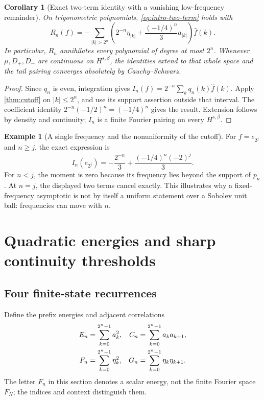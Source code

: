 \documentclass[11pt,a4paper]{article}
\newtheorem{corollary}[theorem]{Corollary}
\theoremstyle{definition}
\newtheorem{example}[theorem]{Example}
\theoremstyle{remark}
\numberwithin{equation}{section}
\begin{document}
\begin{corollary}[Exact two-term identity with a vanishing low-frequency remainder]
\label{cor:tail-formula}
On trigonometric polynomials, \eqref{eq:intro-two-term} holds with
\begin{equation}
 R_n(f)=-\sum_{|k|>2^n}
 \left(2^{-n}\eta_{|k|}+\frac{(-1/4)^n}{3}a_{|k|}\right)\widehat f(k).
 \label{eq:exact-tail}
\end{equation}
In particular, $R_n$ annihilates every polynomial of degree at most $2^n$.
Whenever $\mu,D_+,D_-$ are continuous on $H^{s,\beta}$, the identities extend
to that whole space and the tail pairing converges absolutely by
Cauchy--Schwarz.
\end{corollary}
\begin{proof}
Since $q_n$ is even, integration gives
$I_n(f)=2^{-n}\sum_kq_n(k)\widehat f(k)$. Apply
\cref{thm:cutoff} on $|k|\le2^n$, and use its support assertion outside
that interval. The coefficient identity
$2^{-n}(-1/2)^n=(-1/4)^n$ gives the result. Extension follows by density
and continuity; $I_n$ is a finite Fourier pairing on every $H^{s,\beta}$.
\end{proof}

\begin{example}[A single frequency and the nonuniformity of the cutoff]
For $f=e_{2^j}$ and $n\ge j$, the exact expression is
\[
 I_n(e_{2^j})=-\frac{2^{-n}}3+
       \frac{(-1/4)^n(-2)^j}{3}.
\]
For $n<j$, the moment is zero because its frequency lies beyond the support
of $p_n$. At $n=j$, the displayed two terms cancel exactly. This illustrates
why a fixed-frequency asymptotic is not by itself a uniform statement over
a Sobolev unit ball: frequencies can move with $n$.
\end{example}

\section{Quadratic energies and sharp continuity thresholds}
\label{sec:energies}

\subsection{Four finite-state recurrences}
Define the prefix energies and adjacent correlations
\begin{align}
 E_n&=\sum_{k=0}^{2^n-1}a_k^2,&
 C_n&=\sum_{k=0}^{2^n-1}a_ka_{k+1},\notag\\
 F_n&=\sum_{k=0}^{2^n-1}\eta_k^2,&
 G_n&=\sum_{k=0}^{2^n-1}\eta_k\eta_{k+1}.
 \label{eq:four-energies}
\end{align}
The letter $F_n$ in this section denotes a scalar energy, not the finite
Fourier space $F_N$; the indices and context distinguish them.
\end{document}
